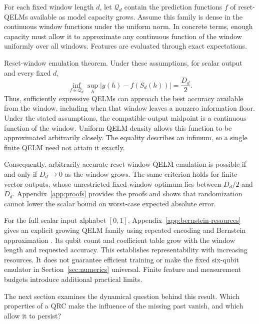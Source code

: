 For each fixed window length $d$, let $\mathcal Q_d$ contain the prediction
functions $f$ of reset-QELMs available as model capacity grows. Assume this family is dense in the
continuous window functions under the uniform norm. In concrete terms,
enough capacity must allow it to approximate any continuous function of
the window uniformly over all windows. Features are evaluated through
exact expectations.

Reset-window emulation theorem. Under these assumptions, for scalar
output and every fixed $d$,
\begin{equation}
 \boxed{\inf_{f\in\mathcal Q_d}\sup_h
 |y(h)-f(S_d(h))|=\frac{D_d}{2}.}
 \label{eq:qrc-qelm-equivalence}
\end{equation}
Thus, sufficiently expressive QELMs can approach the best accuracy available
from the window, including when that window leaves a nonzero information
floor. Under the stated assumptions, the compatible-output midpoint is a
continuous function of the window. Uniform QELM density allows this function
to be approximated arbitrarily closely. The equality describes an infimum,
so a single finite QELM need not attain it exactly.

Consequently, arbitrarily accurate reset-window QELM emulation is
possible if and only if $D_d\longrightarrow0$ as the window grows.
The same criterion holds for finite vector outputs, whose unrestricted
fixed-window optimum lies between $D_d/2$ and $D_d$.
Appendix~\ref{app:proofs} provides the proofs and shows that randomization
cannot lower the scalar bound on worst-case expected absolute error.

For the full scalar input alphabet $[0,1]$, Appendix~\ref{app:bernstein-resources}
gives an explicit growing QELM family
using repeated encoding and Bernstein approximation
\cite{goto2021universal,yu2024nonasymptotic}. Its qubit count and coefficient
table grow with the window length and requested accuracy. This establishes
representability with increasing resources. It does not guarantee efficient
training or make the fixed six-qubit emulator in Section~\ref{sec:numerics}
universal. Finite feature and measurement budgets introduce additional
practical limits.

The next section examines the dynamical question behind this result.
Which properties of a QRC make the influence of the missing past vanish,
and which allow it to persist?
